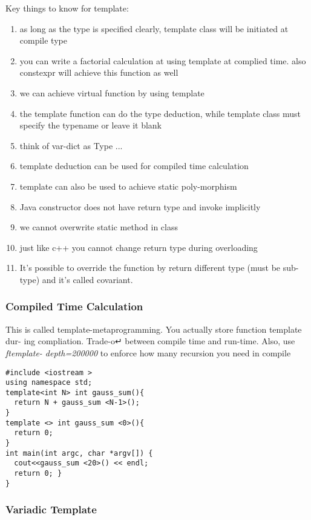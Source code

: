 Key things to know for template:
\begin{enumerate}
\item as long as the type is specified clearly, template class will be initiated at compile type
\item you can write a factorial calculation at using template at complied time. also {\color{blue}constexpr} will achieve this function as well
\item we can achieve virtual function by using template
\item the template function can do the type deduction, while template class must specify the typename or leave it blank
\item think of var-dict as Type ...
\item template deduction can be used for compiled time calculation
\item template can also be used to achieve static poly-morphism
\item Java constructor does not have return type and invoke implicitly
\item we cannot overwrite static method in class
\item just like c++ you cannot change return type during overloading
\item It's possible to override the function by return different type (must be sub-type) and it's called {\color{red}covariant}.
\end{enumerate}

\subsubsection{Compiled Time Calculation}
This is called template-metaprogramming. You actually store function template dur- ing compliation. Trade-o↵ between compile time and run-time. Also, use \textit{ftemplate- depth=200000} to enforce how many recursion you need in compile

\begin{lstlisting}
#include <iostream >
using namespace std;
template<int N> int gauss_sum(){
  return N + gauss_sum <N-1>();
}
template <> int gauss_sum <0>(){
  return 0;
}
int main(int argc, char *argv[]) {
  cout<<gauss_sum <20>() << endl;
  return 0; }
}
\end{lstlisting}

\subsubsection{Variadic Template}

